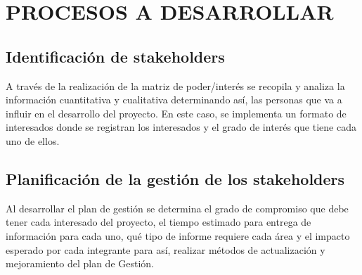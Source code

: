 \chapter{PROCESOS A DESARROLLAR}
%
\section{Identificaci\'on de stakeholders}
%
A trav\'es de la realizaci\'on de la matriz de poder/inter\'es se recopila y analiza la 
informaci\'on cuantitativa y cualitativa determinando as\'i, las personas que va a influir
en el desarrollo del proyecto. En este caso, se implementa un formato de interesados donde se
registran los interesados y el grado de inter\'es que tiene cada uno de ellos.%

\section{Planificaci\'on de la gesti\'on de los stakeholders}
%
Al desarrollar el plan de gesti\'on se determina el grado de compromiso que debe tener
cada interesado del proyecto, el tiempo estimado para entrega de informaci\'on para cada
uno, qu\'e tipo de informe requiere cada \'area y el impacto esperado por cada integrante 
para as\'i, realizar m\'etodos de actualizaci\'on y mejoramiento del plan de Gesti\'on.
